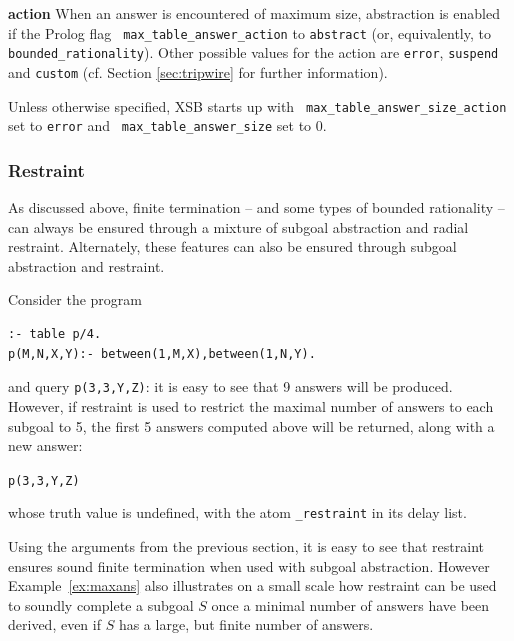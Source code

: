 \item {\bf action} When an answer is encountered of maximum size,
  abstraction is enabled if the Prolog flag {\tt
    max\_table\_answer\_action} to {\tt abstract} (or, equivalently,
  to {\tt bounded\_rationality}).  Other possible values for the
  action are {\tt error}, {\tt suspend} and {\tt custom} (cf. Section
  \ref{sec:tripwire} for further information).  \ei


%
Unless otherwise specified, XSB starts up with {\tt
  max\_table\_answer\_size\_action} set to {\tt error} and {\tt
  max\_table\_answer\_size} set to 0.  
%

\subsubsection{\MAXANS{} Restraint} \label{sec:answer-count-restraint}

As discussed above, finite termination -- and some types of bounded
rationality -- can always be ensured through a mixture of subgoal
abstraction and radial restraint.  Alternately, these features can
also be ensured through subgoal abstraction and \maxans{} restraint.

\begin{example} \label{ex:maxans}
Consider the program

\begin{verbatim}
:- table p/4.
p(M,N,X,Y):- between(1,M,X),between(1,N,Y).
\end{verbatim}

\noindent
and query {\tt p(3,3,Y,Z)}: it is easy to see that 9 answers will be
produced.  However, if \maxans{} restraint is used to restrict the
maximal number of answers to each subgoal to 5, the first 5 answers
computed above will be returned, along with a new answer:

{\tt p(3,3,Y,Z)}

\noindent
whose truth value is undefined, with the atom 
%
{\tt \maxUans\_restraint} in its delay list.
\end{example}

Using the arguments from the previous section, it is easy to see that
\maxans{} restraint ensures sound finite termination when used with
subgoal abstraction.  However Example~\ref{ex:maxans} also illustrates
on a small scale how \maxans{} restraint can be used to soundly
complete a subgoal $S$ once a minimal number of answers have been
derived, even if $S$ has a large, but finite number of answers.

